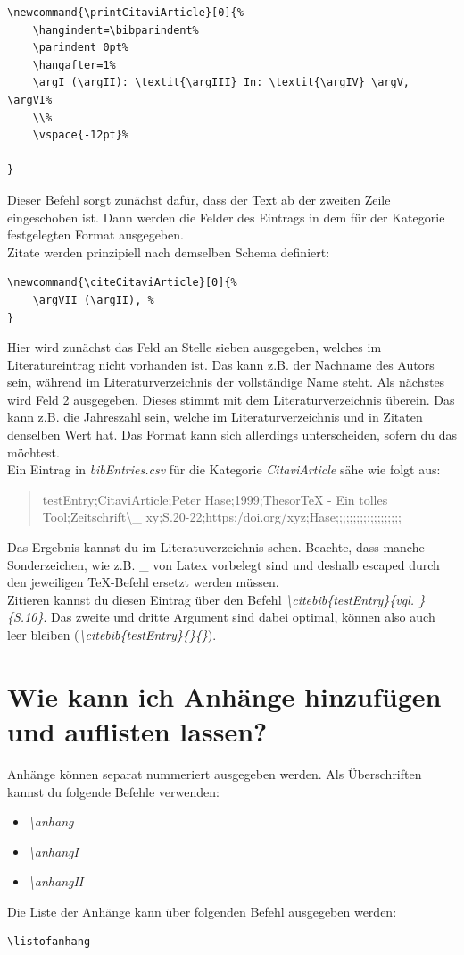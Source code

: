 \documentclass[12pt]{article}
\begin{document}
\begin{lstlisting}
\newcommand{\printCitaviArticle}[0]{%
    \hangindent=\bibparindent%
    \parindent 0pt%
    \hangafter=1%
    \argI (\argII): \textit{\argIII} In: \textit{\argIV} \argV, \argVI%
    \\%
    \vspace{-12pt}%

}
\end{lstlisting}
Dieser Befehl sorgt zunächst dafür, dass der Text ab der zweiten Zeile eingeschoben ist. Dann werden die Felder des Eintrags in dem für der Kategorie festgelegten Format ausgegeben.\\
Zitate werden prinzipiell nach demselben Schema definiert:
\begin{lstlisting}
\newcommand{\citeCitaviArticle}[0]{%
    \argVII (\argII), %
}
\end{lstlisting}
Hier wird zunächst das Feld an Stelle sieben ausgegeben, welches im Literatureintrag nicht vorhanden ist. Das kann z.B. der Nachname des Autors sein, während im Literaturverzeichnis der vollständige Name steht. Als nächstes wird Feld 2 ausgegeben. Dieses stimmt mit dem Literaturverzeichnis überein. Das kann z.B. die Jahreszahl sein, welche im Literaturverzeichnis und in Zitaten denselben Wert hat. Das Format kann sich allerdings unterscheiden, sofern du das möchtest.\\
Ein Eintrag in \textit{bibEntries.csv} für die Kategorie \textit{CitaviArticle} sähe wie folgt aus:
\begin{quote}
testEntry;CitaviArticle;Peter Hase;1999;ThesorTeX - Ein tolles Tool;Zeitschrift\textbackslash\_ xy;S.20-22;https:/doi.org/xyz;Hase;;;;;;;;;;;;;;;;;;;
\end{quote}
Das Ergebnis kannst du im Literatuverzeichnis sehen. Beachte, dass manche Sonderzeichen, wie z.B. \_ von Latex vorbelegt sind und deshalb escaped durch den jeweiligen TeX-Befehl ersetzt werden müssen.\\
Zitieren kannst du diesen Eintrag über den Befehl \textit{\textbackslash citebib\{testEntry\}\{vgl. \}\{S.10\}}. Das zweite und dritte Argument sind dabei optimal, können also auch leer bleiben (\textit{\textbackslash citebib\{testEntry\}\{\}\{\}}).

\section{Wie kann ich Anhänge hinzufügen und auflisten lassen?}
Anhänge können separat nummeriert ausgegeben werden. Als Überschriften kannst du folgende Befehle verwenden:
\begin{itemize}
\item \textit{\textbackslash anhang}
\item \textit{\textbackslash anhangI}
\item \textit{\textbackslash anhangII}
\end{itemize}
Die Liste der Anhänge kann über folgenden Befehl ausgegeben werden:
\begin{lstlisting}
\listofanhang
\end{lstlisting}
\end{document}
